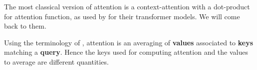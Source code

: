 \documentclass[c,8pt]{beamer}
\begin{document}
\def\dlcdecktitle{Attention Mechanisms}
\def\dlclecturenumber{13}
\def\dlcdecknumber{2}

\newcommand{\scalelines}[6]{%
  \draw[line width=0.75pt,white,yshift=3pt] (#1, #2) -- (11.6, #2);
  \draw[line width=0.75pt,white,yshift=3pt] (#3, #4) -- (11.6, #4);
  \draw[line width=0.75pt,white,yshift=3pt] (11.4, #6) -- (#5, #6);
  \draw[very thin,gray,yshift=3pt] (#1, #2) -- (11.6, #2);
  \draw[very thin,gray,yshift=3pt] (#3, #4) -- (11.6, #4);
  \draw[very thin,gray,yshift=3pt] (11.4, #6) -- (#5, #6);
  \draw[<->,shorten <= 0.5pt,shorten >= 0.5pt,yshift=3pt] (11.5, #2) -- (11.5, #6);
  \draw[<->,shorten <= 0.5pt,shorten >= 0.5pt,yshift=3pt] (11.5, #4) -- (11.5, #6);
}


\openingframe




\begin{frame}{}{}

The most classical version of attention is a context-attention with a
dot-product for attention function, as used by \cite{arxiv-1706.03762}
for their transformer models. We will come back to them.

Using the terminology of \cite{arxiv-1410.5401}, attention is an
averaging of \textbf{values}  associated to
\textbf{keys} matching a
\textbf{query}. Hence the keys used for
computing attention and the values to average are different
quantities.

\end{frame}

\end{document}
